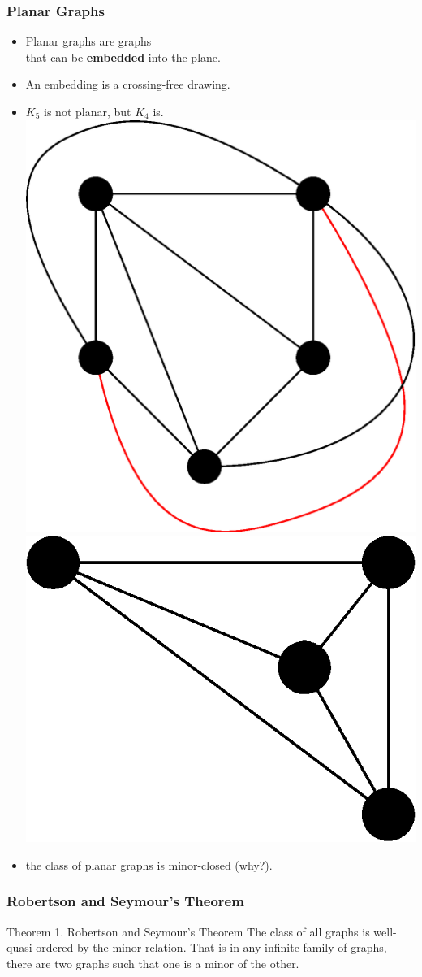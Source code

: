 \documentclass[t,usenames,dvipsnames]{beamer}
\begin{document}
\begin{frame} \frametitle{Planar Graphs}
	\begin{itemize}[<+->]
		\item Planar graphs are graphs\\
			\hspace{1cm}that can be \textbf{embedded} into the plane.
		\item An embedding is a crossing-free drawing.
		\item $K_5$ is not planar, but $K_4$ is.\\
			{
			\includegraphics[width=0.3\linewidth]{k5.eps}
			\hspace{0.2\linewidth}
			\includegraphics[width=0.3\linewidth]{k4.eps}
			}
		\item the class of planar graphs is minor-closed (why?).
	\end{itemize}
\end{frame}
\begin{frame} \frametitle{Robertson and Seymour's Theorem}
	\begin{block}{Theorem 1. Robertson and Seymour's Theorem}
		The class of all graphs is well-quasi-ordered by the minor relation. That is in any
		infinite family of graphs, there are two graphs such that one is a minor of the
		other.
	\end{block}

	
\end{frame}
\end{document}
